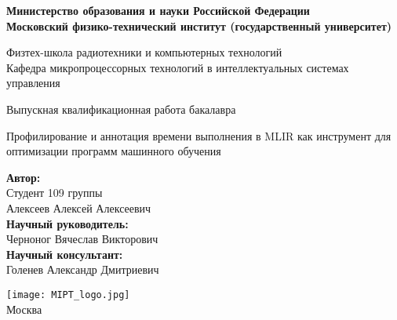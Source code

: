 \begin{center}
    \large\textbf{Министерство образования и науки Российской Федерации \\
    Московский физико-технический институт (государственный
    университет)} \\
    \vspace{1cm}

    Физтех-школа радиотехники и компьютерных технологий \\

    Кафедра микропроцессорных технологий в интеллектуальных системах управления \\

    \vspace{3em}

    Выпускная квалификационная работа бакалавра
\end{center}

\begin{center}
    \vspace{\fill}
    \LARGE{Профилирование и аннотация времени выполнения в MLIR как инструмент для оптимизации программ машинного обучения}

    \vspace{\fill}
\end{center}


\begin{flushright}
    \textbf{Автор:} \\
    Студент 109 группы \\
    Алексеев Алексей Алексеевич \\
    \vspace{2em}
    \textbf{Научный руководитель:} \\
    Черноног Вячеслав Викторович \\
    \vspace{2em}
    \textbf{Научный консультант:} \\
    Голенев Александр Дмитриевич \\
\end{flushright}

\vspace{7em}

\begin{center}
    \texttt{[image: MIPT\_logo.jpg]}\\
    Москва \the\year{}
\end{center}

\thispagestyle{empty}

\newpage
\setcounter{page}{2}
\fancyfoot[c]{\thepage}
\fancyhead[R]{}